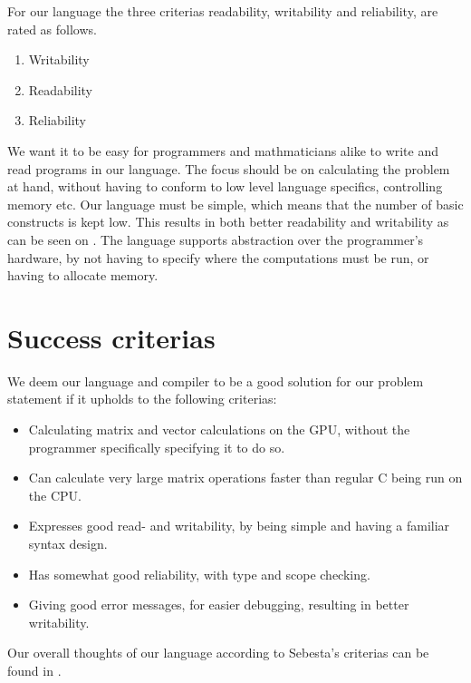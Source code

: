 For our language the three criterias readability, writability and reliability, are rated as follows.

\begin{enumerate}
	\item Writability
	\item Readability
	\item Reliability
\end{enumerate}

We want it to be easy for programmers and mathmaticians alike to write and read programs in our language.
The focus should be on calculating the problem at hand, without having to conform to low level language specifics, controlling memory etc.
Our language must be simple, which means that the number of basic constructs is kept low. 
This results in both better readability and writability as can be seen on .
The language supports abstraction over the programmer's hardware, by not having to specify where the computations must be run, or having to allocate memory.


\section{Success criterias}\label{sec:OurCriterias}
We deem our language and compiler to be a good solution for our problem statement if it upholds to the following criterias:

\begin{itemize}
	\item Calculating matrix and vector calculations on the GPU, without the programmer specifically specifying it to do so.
	\item Can calculate very large matrix operations faster than regular C being run on the CPU.
	\item Expresses good read- and writability, by being simple and having a familiar syntax design.
	\item Has somewhat good reliability, with type and scope checking.
	\item Giving good error messages, for easier debugging, resulting in better writability.
\end{itemize}

Our overall thoughts of our language according to Sebesta's criterias can be found in .


